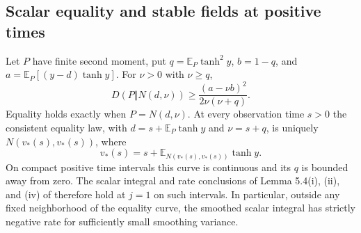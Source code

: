 \subsection{Scalar equality and stable fields at positive times}

\begin{lemma}\label{prof:endpoint-scalar}
Let $P$ have finite second moment, put
$q=\mathbb E_P\tanh^2 y$, $b=1-q$, and
$a=\mathbb E_P[(y-d)\tanh y]$.  For $\nu>0$ with $\nu\ge q$,
\[
 D(P\Vert N(d,\nu))\ge\frac{(a-\nu b)^2}{2\nu(\nu+q)}.
\]
Equality holds exactly when $P=N(d,\nu)$.  At every observation time
$s>0$ the consistent equality law, with
$d=s+\mathbb E_P\tanh y$ and $\nu=s+q$, is uniquely
$N(v_*(s),v_*(s))$, where
\[
 v_*(s)=s+\mathbb E_{N(v_*(s),v_*(s))}\tanh y.
\]
On compact positive time intervals this curve is continuous and its
$q$ is bounded away from zero.  The scalar integral and rate conclusions
of Lemma 5.4(i), (ii), and (iv) of \cite{AcceptedGap} therefore
hold at $j=1$ on such intervals.  In particular, outside any fixed
neighborhood of the equality curve, the smoothed scalar integral has
strictly negative rate for sufficiently small smoothing variance.
\end{lemma}

